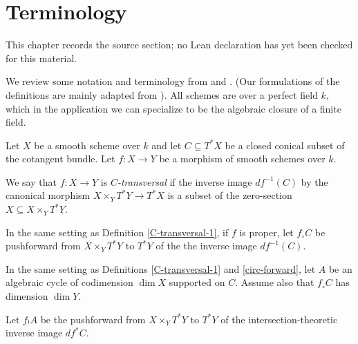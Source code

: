 \chapter{Terminology}
\label{bounds-stalks-perverse-sheaves-characteristic-p-shende-chapter-02}

\begin{remark}
\label{bounds-stalks-perverse-sheaves-characteristic-p-shende-chapter-02-source}
This chapter records the source section; no Lean declaration has yet been checked for this material.
\notready
\end{remark}

We review some notation and terminology from \cite{Beilinson} and \cite{saito1}. (Our formulations of the definitions are mainly adapted from \cite{saito1}). All schemes are over a perfect field $k$, which in the application we can specialize to be the algebraic closure of a finite field.

\begin{definition}
\notready\label{C-transversal-1} \cite[Definition 3.5(1)]{saito1} Let $X$ be a smooth scheme over $k$ and let $C \subseteq T^* X$ be a closed conical subset of the cotangent bundle. Let $f: X\to Y$ be a morphism of smooth schemes over $k$.

We say that $f: X \to Y$ is \emph{$C$-transversal} if the inverse image $df^{-1}(C)$ by the canonical morphism $X \times_Y T^* Y \to T^* X$ is a subset of the zero-section $X \subseteq X \times_Y T^* Y$.
\end{definition}

\begin{definition}
\notready\cite[(1.2)]{Beilinson}\label{circ-forward} In the same setting as Definition \ref{C-transversal-1}, if $f$ is proper, let $f_\circ C$ be pushforward from $X \times_Y T^* Y$ to $T^*Y $ of the the inverse image $df^{-1}(C)$.

\end{definition}

\begin{definition}
\notready\cite[(2.3)]{saito-direct}\label{shriek-forward}  In the same setting as Definitions \ref{C-transversal-1} and \ref{circ-forward}, let $A$ be an algebraic cycle of codimension $\dim X$ supported on $C$. Assume also that $f_\circ C$ has dimension $\dim Y$.

Let $f_!  A$ be the pushforward from $X \times_Y T^* Y$ to $T^*Y $ of the intersection-theoretic inverse image $df^* C$. \end{definition}



